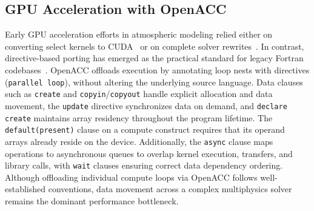 \subsection{GPU Acceleration with OpenACC}
\label{sec:bg-openacc}

Early GPU acceleration efforts in atmospheric modeling relied either on 
converting select kernels to CUDA~\cite{michalakes2008,norman2015} or 
on complete solver rewrites~\cite{schalkwijk2012,vanheerwaarden2017}. 
In contrast, directive-based porting has emerged as the practical 
standard for legacy Fortran codebases~\cite{lapillonne2014,govett2017nim,giorgetta2022,esclapez2025dales,otero2019nek}.
OpenACC offloads execution by annotating loop nests with directives
(\texttt{parallel loop}), without altering the underlying source language.
Data clauses such as \texttt{create} and \texttt{copyin}/\texttt{copyout}
handle explicit allocation and data movement, the \texttt{update}
directive synchronizes data on demand, and \texttt{declare create}
maintains array residency throughout the program lifetime. The
\texttt{default(present)} clause on a compute construct requires that
its operand arrays already reside on the device.
Additionally, the \texttt{async} clause maps operations to asynchronous 
queues to overlap kernel execution, transfers, and library calls, 
with \texttt{wait} clauses ensuring correct data dependency ordering.
Although offloading individual compute loops via OpenACC follows 
well-established conventions, data movement across a complex
multiphysics solver remains the dominant performance bottleneck.

